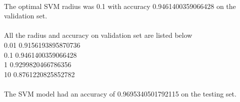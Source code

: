 \begin{answer}\\
The optimal SVM radius was 0.1 with accuracy 0.9461400359066428 on the validation set.\\
\\
All the radius and accuracy on validation set are listed below\\
0.01 0.9156193895870736\\
0.1 0.9461400359066428\\
1 0.9299820466786356\\
10 0.8761220825852782\\\\
The SVM model had an accuracy of 0.9695340501792115 on the testing set.\\
\end{answer}
